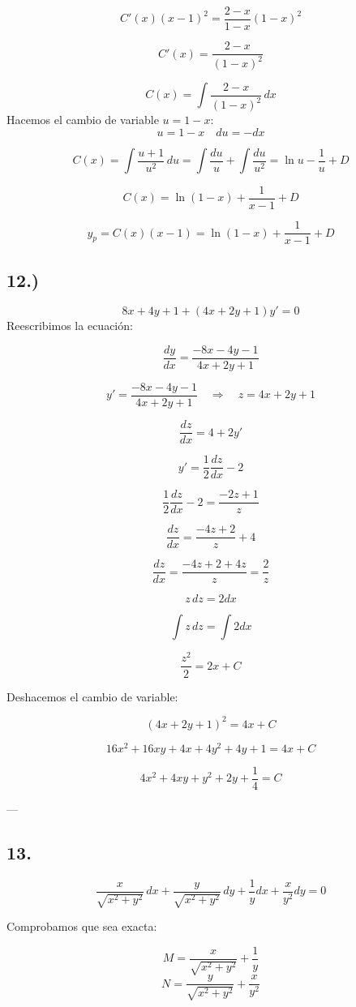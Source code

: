 \documentclass[a4paper,12pt]{article}
\begin{document}
\[
C'(x)(x - 1)^2 = \frac{2 - x}{1 - x} (1 - x)^2
\]

\[
C'(x) = \frac{2 - x}{(1 - x)^2}
\]

\[
C(x) = \int \frac{2 - x}{(1 - x)^2}\, dx
\]
Hacemos el cambio de variable \(u = 1 - x\):
\[
u = 1 - x \quad du = -dx
\]

\[
C(x) = \int \frac{u + 1}{u^2}\, du = \int \frac{du}{u} + \int \frac{du}{u^2} = \ln u - \frac{1}{u} + D
\]

\[
C(x) = \ln(1 - x) + \frac{1}{x - 1} + D
\]

\[
y_p = C(x)(x - 1) = \ln(1 - x) + \frac{1}{x - 1} + D
\]
\newpage
\noindent
\subsection*{12.)}
\[
8x + 4y + 1 + (4x + 2y + 1)y' = 0
\]
Reescribimos la ecuación:

\[
\frac{dy}{dx} = \frac{-8x - 4y - 1}{4x + 2y + 1}
\]

\[
y' = \frac{-8x - 4y - 1}{4x + 2y + 1} \quad \Rightarrow \quad z = 4x + 2y + 1
\]

\[
\frac{dz}{dx} = 4 + 2y'
\]

\[
y' = \frac{1}{2} \frac{dz}{dx} - 2
\]

\[
\frac{1}{2}\frac{dz}{dx} - 2 = \frac{-2z + 1}{z}
\]

\[
\frac{dz}{dx} = \frac{-4z + 2}{z} + 4
\]

\[
\frac{dz}{dx} = \frac{-4z + 2 + 4z}{z} = \frac{2}{z}
\]

\[
z\, dz = 2 dx
\]

\[
\int z\, dz = \int 2 dx
\]

\[
\frac{z^2}{2} = 2x + C
\]

Deshacemos el cambio de variable:

\[
(4x + 2y + 1)^2 = 4x + C
\]

\[
16x^2 + 16xy + 4x + 4y^2 + 4y + 1 = 4x + C
\]

\[
4x^2 + 4xy + y^2 + 2y + \frac{1}{4} = C
\]

---

\subsection*{13.}
\[
\frac{x}{\sqrt{x^2 + y^2}}\, dx + \frac{y}{\sqrt{x^2 + y^2}}\, dy + \frac{1}{y} dx + \frac{x}{y^2} dy = 0
\]

Comprobamos que sea exacta:

\[
M = \frac{x}{\sqrt{x^2 + y^2}} + \frac{1}{y}
\]
\[
N = \frac{y}{\sqrt{x^2 + y^2}} + \frac{x}{y^2}
\]
\end{document}
